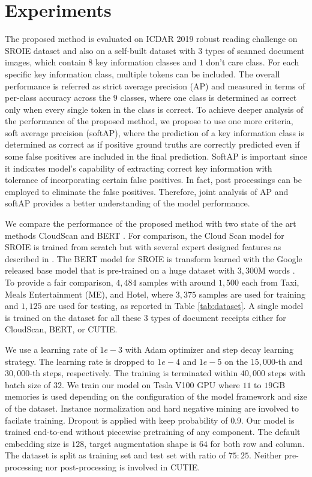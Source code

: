\documentclass[10pt,twocolumn,letterpaper]{article}
\begin{document}
\section{Experiments}
\label{experiment}
The proposed method is evaluated on ICDAR 2019 robust reading challenge on SROIE dataset and also on a self-built dataset with $3$ types of scanned document images, which contain $8$ key information classes and $1$ don't care class. For each specific key information class, multiple tokens can be included. The overall performance is referred as strict average precision (AP) and measured in terms of per-class accuracy across the $9$ classes, where one class is determined as correct only when every single token in the class is correct. To achieve deeper analysis of the performance of the proposed method, we propose to use one more criteria, soft average precision (softAP), where the prediction of a key information class is determined as correct as if positive ground truths are correctly predicted even if some false positives are included in the final prediction. SoftAP is important since it indicates model's capability of extracting correct key information with tolerance of incorporating certain false positives. In fact, post processings can be employed to eliminate the false positives. Therefore, joint analysis of AP and softAP provides a better understanding of the model performance.

We compare the performance of the proposed method with two state of the art methods CloudScan \cite{cloudscan} and BERT \cite{bert}. For comparison, the Cloud Scan model for SROIE is trained from scratch but with several expert designed features as described in \cite{cloudscan}. The BERT model for SROIE is transform learned with the Google released base model that is pre-trained on a huge dataset with $3,300$M words \cite{bert,bertgit}. To provide a fair comparison, $4,484$ samples with around $1,500$ each from Taxi, Meals Entertainment (ME), and Hotel, where $3,375$ samples are used for training and $1,125$ are used for testing, as reported in Table \ref{tab:dataset}. A single model is trained on the dataset for all these $3$ types of document receipts either for CloudScan, BERT, or CUTIE.

We use a learning rate of $1e-3$ with Adam optimizer and step decay learning strategy. The learning rate is dropped to $1e-4$ and $1e-5$ on the $15,000$-th and $30,000$-th steps, respectively. The training is terminated within $40,000$ steps with batch size of $32$. We train our model on Tesla V100 GPU where $11$ to $19$GB memories is used depending on the configuration of the model framework and size of the dataset. Instance normalization and hard negative mining are involved to facilate training. Dropout is applied with keep probability of $0.9$. Our model is trained end-to-end without piecewise pretraining of any component. The default embedding size is $128$, target augmentation shape is $64$ for both row and column. The dataset is split as training set and test set with ratio of $75:25$. Neither pre-processing nor post-processing is involved in CUTIE.
\end{document}

